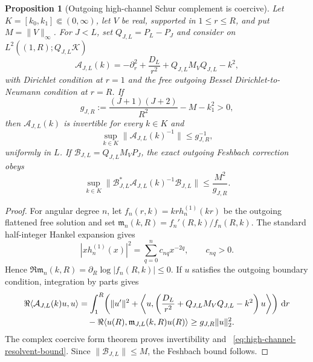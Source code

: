 \documentclass[11pt]{article}
\newcommand{\dd}{\,\mathrm d}
\newtheorem{proposition}[theorem]{Proposition}
\theoremstyle{definition}
\theoremstyle{remark}
\begin{document}
\begin{proposition}[Outgoing high-channel Schur complement is coercive]
\label{prop:outgoing-high-channel-coercivity}
Let $K=[k_0,k_1]\Subset(0,\infty)$, let $V$ be real, supported in
$1\leq r\leq R$, and put $M=\|V\|_\infty$.  For $J<L$, set
$Q_{J,L}=P_L-P_J$ and consider on
$L^2((1,R);Q_{J,L}\mathcal K)$
\begin{equation}
 \mathcal A_{J,L}(k)
 =-\partial_r^2+\frac{D_L}{r^2}
   +Q_{J,L}M_VQ_{J,L}-k^2,
 \label{eq:outgoing-high-operator}
\end{equation}
with Dirichlet condition at $r=1$ and the free outgoing Bessel
Dirichlet-to-Neumann condition at $r=R$.  If
\begin{equation}
 g_{J,R}:=\frac{(J+1)(J+2)}{R^2}-M-k_1^2>0,
 \label{eq:high-channel-gap}
\end{equation}
then $\mathcal A_{J,L}(k)$ is invertible for every $k\in K$ and
\begin{equation}
 \sup_{k\in K}\|\mathcal A_{J,L}(k)^{-1}\|
 \leq g_{J,R}^{-1},
 \label{eq:high-channel-resolvent-bound}
\end{equation}
uniformly in $L$.  If
$\mathcal B_{J,L}=Q_{J,L}M_VP_J$, the exact outgoing Feshbach correction obeys
\begin{equation}
 \sup_{k\in K}
 \|\mathcal B_{J,L}^*\mathcal A_{J,L}(k)^{-1}
       \mathcal B_{J,L}\|
 \leq \frac{M^2}{g_{J,R}}.
 \label{eq:high-channel-self-energy-bound}
\end{equation}
\end{proposition}

\begin{proof}
For angular degree $n$, let
$f_n(r,k)=krh_n^{(1)}(kr)$ be the outgoing flattened free solution and set
$\mathfrak m_n(k,R)=f_n'(R,k)/f_n(R,k)$.  The standard half-integer Hankel
expansion gives
\begin{equation}
 |xh_n^{(1)}(x)|^2=\sum_{q=0}^n c_{nq}x^{-2q},
 \qquad c_{nq}>0.
 \label{eq:spherical-Hankel-amplitude}
\end{equation}
Hence $\Re\mathfrak m_n(k,R)=\partial_R\log|f_n(R,k)|\leq0$.
If $u$ satisfies the outgoing boundary condition, integration by parts gives
\begin{align}
 \Re\langle\mathcal A_{J,L}(k)u,u\rangle
 &=\int_1^R\!\left(\|u'\|^2
   +\left\langle u,
    \left(\frac{D_L}{r^2}+Q_{J,L}M_VQ_{J,L}-k^2\right)u
    \right\rangle\right)\dd r\notag\\
 &\quad-\Re\langle u(R),\mathfrak m_{J,L}(k,R)u(R)\rangle
 \geq g_{J,R}\|u\|_2^2.
 \label{eq:outgoing-high-coercive-form}
\end{align}
The complex coercive form theorem proves invertibility and
~\eqref{eq:high-channel-resolvent-bound}.  Since
$\|\mathcal B_{J,L}\|\leq M$, the Feshbach bound follows.
\end{proof}
\end{document}
